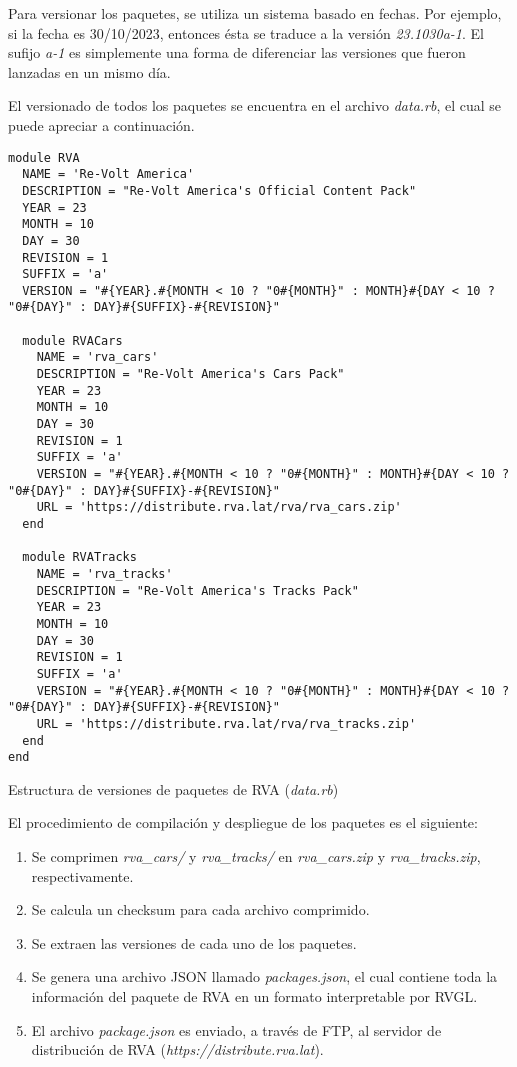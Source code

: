Para versionar los paquetes, se utiliza un sistema basado en fechas. Por ejemplo, si la fecha es 30/10/2023, entonces ésta se traduce a la versión \textit{23.1030a-1}. El sufijo \textit{a-1} es simplemente una forma de diferenciar las versiones que fueron lanzadas en un mismo día.

\newpage

El versionado de todos los paquetes se encuentra en el archivo \textit{data.rb}, el cual se puede apreciar a continuación.

\begin{longlisting}
  \begin{verbatim}  
module RVA
  NAME = 'Re-Volt America'
  DESCRIPTION = "Re-Volt America's Official Content Pack"
  YEAR = 23
  MONTH = 10
  DAY = 30
  REVISION = 1
  SUFFIX = 'a'
  VERSION = "#{YEAR}.#{MONTH < 10 ? "0#{MONTH}" : MONTH}#{DAY < 10 ? "0#{DAY}" : DAY}#{SUFFIX}-#{REVISION}"
  
  module RVACars
    NAME = 'rva_cars'
    DESCRIPTION = "Re-Volt America's Cars Pack"
    YEAR = 23
    MONTH = 10
    DAY = 30
    REVISION = 1
    SUFFIX = 'a'
    VERSION = "#{YEAR}.#{MONTH < 10 ? "0#{MONTH}" : MONTH}#{DAY < 10 ? "0#{DAY}" : DAY}#{SUFFIX}-#{REVISION}"
    URL = 'https://distribute.rva.lat/rva/rva_cars.zip'
  end
  
  module RVATracks
    NAME = 'rva_tracks'
    DESCRIPTION = "Re-Volt America's Tracks Pack"
    YEAR = 23
    MONTH = 10
    DAY = 30
    REVISION = 1
    SUFFIX = 'a'
    VERSION = "#{YEAR}.#{MONTH < 10 ? "0#{MONTH}" : MONTH}#{DAY < 10 ? "0#{DAY}" : DAY}#{SUFFIX}-#{REVISION}"
    URL = 'https://distribute.rva.lat/rva/rva_tracks.zip'
  end
end
  \end{verbatim}
  \caption[Versionado de Paquetes de RVA]{Estructura de versiones de paquetes de RVA (\textit{data.rb})}
\end{longlisting}

\newpage

El procedimiento de compilación y despliegue de los paquetes es el siguiente:
\begin{enumerate}
  \item Se comprimen \textit{rva\_cars/} y \textit{rva\_tracks/} en \textit{rva\_cars.zip} y \textit{rva\_tracks.zip}, respectivamente.
  \item Se calcula un checksum para cada archivo comprimido.
  \item Se extraen las versiones de cada uno de los paquetes.
  \item Se genera una archivo JSON llamado \textit{packages.json}, el cual contiene toda la información del paquete de RVA en un formato interpretable por RVGL.
  \item El archivo \textit{package.json} es enviado, a través de FTP, al servidor de distribución de RVA (\textit{https://distribute.rva.lat}).
\end{enumerate}

